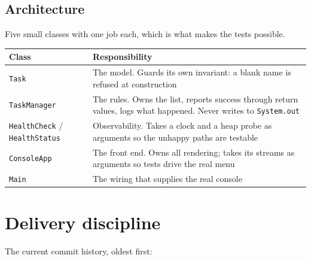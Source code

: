 \documentclass[11pt,a4paper]{article}
\newcommand{\code}[1]{\texttt{\small #1}}
\begin{document}
\subsection{Architecture}

Five small classes with one job each, which is what makes the tests possible.

\begin{table}[h]
\centering
\small
\begin{tabularx}{\textwidth}{@{}l X@{}}
\toprule
\textbf{Class} & \textbf{Responsibility} \\
\midrule
\code{Task} & The model. Guards its own invariant: a blank name is refused at construction \\
\code{TaskManager} & The rules. Owns the list, reports success through return values, logs what happened. Never writes to \code{System.out} \\
\code{HealthCheck} / \code{HealthStatus} & Observability. Takes a clock and a heap probe as arguments so the unhappy paths are testable \\
\code{ConsoleApp} & The front end. Owns all rendering; takes its streams as arguments so tests drive the real menu \\
\code{Main} & The wiring that supplies the real console \\
\bottomrule
\end{tabularx}
\end{table}

\section{Delivery discipline}
\label{sec:delivery}

The current commit history, oldest first:
\end{document}
